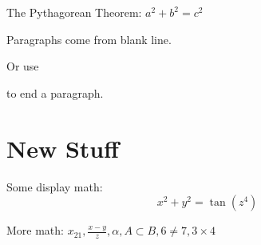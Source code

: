 \documentclass[12pt]{article}
\begin{document}
The Pythagorean Theorem: \(a^2+b^2=c^2\)

Paragraphs come from blank line.

Or use \par to end a paragraph.

\section{New Stuff}

Some display math: \[x^2 + y^2 = \tan(z^4)\]

More math: \(x_{21}, \frac{x-y}{z}, \alpha, A\subset B, 6\neq 7, 3\times 4\)
\end{document}
